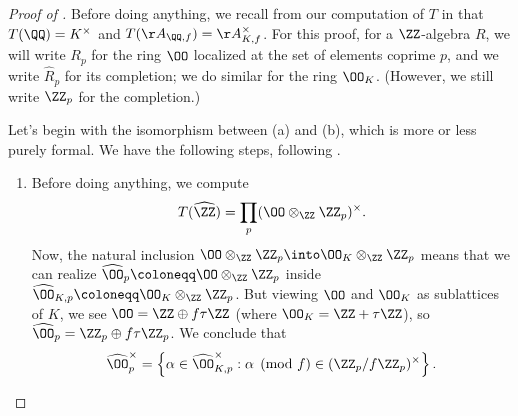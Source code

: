 \documentclass[../notes.tex]{subfiles}
\begin{document}
\begin{proof}[Proof of ]
	Before doing anything, we recall from our computation of $T$ in  that $T(\QQ)=K^\times$ and $T(\AA_{\QQ,f})=\AA_{K,f}^\times$. For this proof, for a $\ZZ$-algebra $R$, we will write $R_p$ for the ring $\OO$ localized at the set of elements coprime $p$, and we write $\widehat R_p$ for its completion; we do similar for the ring $\OO_K$. (However, we still write $\ZZ_p$ for the completion.)
	
	Let's begin with the isomorphism between (a) and (b), which is more or less purely formal. We have the following steps, following .
	\begin{enumerate}
		\item Before doing anything, we compute
		\[T(\widehat\ZZ)=\prod_p(\OO\otimes_\ZZ\ZZ_p)^\times.\]
		Now, the natural inclusion $\OO\otimes_\ZZ\ZZ_p\into\OO_K\otimes_\ZZ\ZZ_p$ means that we can realize $\widehat\OO_p\coloneqq\OO\otimes_\ZZ\ZZ_p$ inside $\widehat\OO_{K,p}\coloneqq\OO_K\otimes_\ZZ\ZZ_p$. But viewing $\OO$ and $\OO_K$ as sublattices of $K$, we see $\OO=\ZZ\oplus f\tau\ZZ$ (where $\OO_K=\ZZ+\tau\ZZ$), so $\widehat\OO_p=\ZZ_p\oplus f\tau\ZZ_p$. We conclude that
		\[\widehat\OO_p^\times=\left\{\alpha\in\widehat\OO_{K,p}^\times:\alpha\pmod f\in(\ZZ_p/f\ZZ_p)^\times\right\}.\]


\end{enumerate}
\end{proof}
\end{document}
